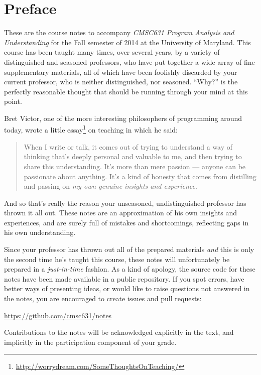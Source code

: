 \section*{Preface}
%

These are the course notes to accompany \emph{CMSC631 Program Analysis
  and Understanding} for the Fall semester of 2014 at the University
of Maryland.
%
This course has been taught many times, over several years, by a
variety of distinguished and seasoned professors, who have put
together a wide array of fine supplementary materials, all of which
have been foolishly discarded by your current professor, who is
neither distinguished, nor seasoned.  ``Why?'' is the perfectly
reasonable thought that should be running through your mind at this
point.

Bret Victor, one of the more interesting philosophers of programming
around today, wrote a little
essay\footnote{\url{http://worrydream.com/SomeThoughtsOnTeaching/}} on
teaching in which he said:
%
\begin{quote}
When I write or talk, it comes out of trying to understand a way of
thinking that's deeply personal and valuable to me, and then trying to
share this understanding. It's more than mere passion --- anyone can
be passionate about anything. It's a kind of honesty that comes from
distilling and passing on \emph{my own genuine insights and
  experience}.
\end{quote}
And so that's really the reason your unseasoned, undistinguished
professor has thrown it all out.  These notes are an approximation of
his own insights and experiences, and are surely full of mistakes and
shortcomings, reflecting gaps in his own understanding.

Since your professor has thrown out all of the prepared materials
\emph{and} this is only the second time he's taught this course, these
notes will unfortunately be prepared in a \emph{just-in-time} fashion.
As a kind of apology, the source code for these notes have been made
available in a public repository.  If you spot errors, have better
ways of presenting ideas, or would like to raise questions not
answered in the notes, you are encouraged to create issues and pull
requests:

\begin{center}
\url{https://github.com/cmsc631/notes}
\end{center}

Contributions to the notes will be acknowledged explicitly in the
text, and implicitly in the participation component of your grade.






